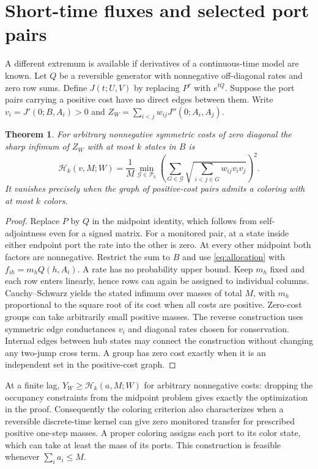 \documentclass[11pt]{article}
\newtheorem{theorem}{Theorem}
\newcommand{\HH}{\mathcal H}
\begin{document}
\section{Short-time fluxes and selected port pairs}
A different extremum is available if derivatives of a continuous-time model are known. Let \(Q\) be a reversible generator with nonnegative off-diagonal rates and zero row sums. Define \(J(t;U,V)\) by replacing \(P^r\) with \(e^{tQ}\). Suppose the port pairs carrying a positive cost have no direct edges between them. Write \(v_i=J'(0;B,A_i)>0\) and \(Z_W=\sum_{i<j}w_{ij}J''(0;A_i,A_j)\).
\begin{theorem}\label{thm:curvature}
For arbitrary nonnegative symmetric costs of zero diagonal the sharp infimum of \(Z_W\) with at most \(k\) states in \(B\) is
\begin{equation}
 \HH_k(v,M;W)=\frac1M\min_{\mathcal G\in\mathcal P_k}
 \left(\sum_{G\in\mathcal G}\sqrt{\sum_{i<j\in G}w_{ij}v_i v_j}\right)^2 .
 \label{eq:curv}
\end{equation}
It vanishes precisely when the graph of positive-cost pairs admits a coloring with at most \(k\) colors.
\end{theorem}
\begin{proof}
Replace \(P\) by \(Q\) in the midpoint identity, which follows from self-adjointness even for a signed matrix. For a monitored pair, at a state inside either endpoint port the rate into the other is zero. At every other midpoint both factors are nonnegative. Restrict the sum to \(B\) and use \eqref{eq:allocation} with \(f_{ih}=m_h Q(h,A_i)\). A rate has no probability upper bound. Keep \(m_h\) fixed and each row enters linearly, hence rows can again be assigned to individual columns. Cauchy--Schwarz yields the stated infimum over masses of total \(M\), with \(m_h\) proportional to the square root of its cost when all costs are positive. Zero-cost groups can take arbitrarily small positive masses. The reverse construction uses symmetric edge conductances \(v_i\) and diagonal rates chosen for conservation. Internal edges between hub states may connect the construction without changing any two-jump cross term. A group has zero cost exactly when it is an independent set in the positive-cost graph.
\end{proof}

At a finite lag, \(Y_W\ge \HH_k(a,M;W)\) for arbitrary nonnegative costs: dropping the occupancy constraints from the midpoint problem gives exactly the optimization in the proof. Consequently the coloring criterion also characterizes when a reversible discrete-time kernel can give zero monitored transfer for prescribed positive one-step masses. A proper coloring assigns each port to its color state, which can take at least the mass of its ports. This construction is feasible whenever \(\sum_i a_i\le M\).
\end{document}
